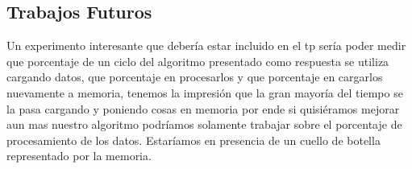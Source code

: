 \subsection{Trabajos Futuros}
Un experimento interesante que debería estar incluido en el tp sería poder medir que porcentaje de un ciclo del algoritmo presentado como respuesta se utiliza cargando datos, que porcentaje en procesarlos y que porcentaje en cargarlos nuevamente a memoria, tenemos la impresión que la gran mayoría del tiempo se la pasa cargando y poniendo cosas en memoria por ende si quisiéramos mejorar aun mas nuestro algoritmo podríamos solamente trabajar sobre el porcentaje de procesamiento de los datos. Estaríamos en presencia de un cuello de botella representado por la memoria.
